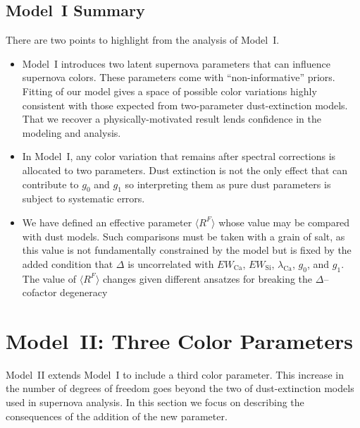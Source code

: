 \documentclass[trackchanges]{aastex62}   	%
\begin{document}
\subsection{Model~I Summary}
There are two points to highlight from the analysis of
Model~I.
\begin{itemize}
\item Model~I introduces two latent supernova parameters that can influence supernova colors.
These parameters come  with ``non-informative'' priors.  Fitting
of our model gives a space of possible color variations highly consistent with those expected from two-parameter dust-extinction models. 
That we recover a physically-motivated  result lends confidence in the modeling and analysis.
\item In Model~I, any  color variation that remains after spectral corrections is allocated to two parameters.
Dust extinction is not the only effect that can contribute to $g_0$ and $g_1$ so interpreting
them as pure dust parameters is subject to systematic errors.
\item We have defined an effective parameter $\langle R^F\rangle$ whose value may be compared with dust models.
Such comparisons must be taken with a grain of salt,
as this value is not fundamentally constrained by the model but is fixed by the added condition that $\Delta$ is
uncorrelated with  $EW_{\text{Ca}}$, $EW_{\mathrm{Si}}$, $\lambda_{\text{Ca}}$,
$g_0$, and $g_1$.  The value of  $\langle R^F\rangle$ changes given different ansatzes  for breaking the $\Delta$--cofactor degeneracy 
\end{itemize}

\section{Model~II: Three Color Parameters}
\label{modelII:sec}
Model~II extends Model~I to include a third color parameter.  This increase in the number of degrees of freedom 
goes beyond the two of dust-extinction models used in supernova analysis.
 In this section we  focus on describing the consequences of the addition of the
new parameter.
\end{document}
